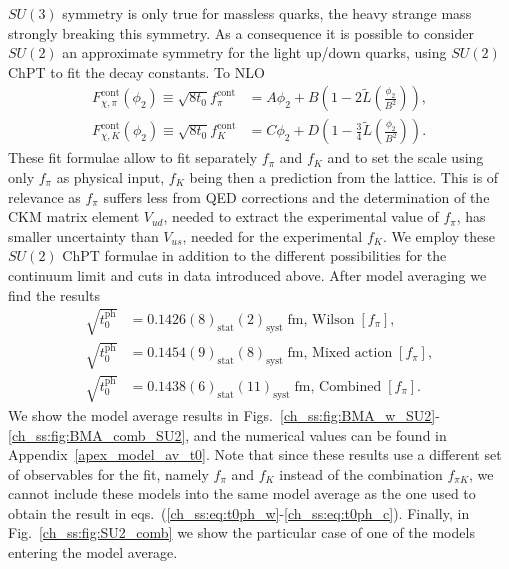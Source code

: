 $SU(3)$ symmetry is only true for massless quarks, the heavy strange mass strongly breaking this symmetry. As a consequence it is possible to consider $SU(2)$ an approximate symmetry for the light up/down quarks, using $SU(2)$ ChPT to fit the decay constants. To NLO~\citep{SU2}
\begin{align}
\label{ch_ss:eq:SU2pi}
F_{\chi,\pi}^{\textrm{cont}}(\phi_2)\equiv\sqrt{8t_0}f_{\pi}^{\textrm{cont}}&=A\phi_2+B\left(1-2\tilde{L}\left(\frac{\phi_2}{B^2}\right)\right),\\
\label{ch_ss:eq:SU2k}
F_{\chi,K}^{\textrm{cont}}(\phi_2)\equiv\sqrt{8t_0}f_K^{\textrm{cont}}&=C\phi_2+D\left(1-\frac{3}{4}\tilde{L}\left(\frac{\phi_2}{B^2}\right)\right).
\end{align}
These fit formulae allow to fit separately $f_{\pi}$ and $f_K$ and to set the scale using only $f_{\pi}$ as physical input, $f_K$ being then a prediction from the lattice. This is of relevance as $f_{\pi}$ suffers less from QED corrections and the determination of the CKM matrix element $V_{ud}$, needed to extract the experimental value of $f_{\pi}$, has smaller uncertainty than $V_{us}$, needed for the experimental $f_K$. We employ these $SU(2)$ ChPT formulae in addition to the different possibilities for the continuum limit and cuts in data introduced above. After model averaging we find the results
\begin{align}
\label{ch_ss:eq:t0ph_fpi}
\sqrt{t_0^{\textrm{ph}}}&=0.1426(8)_{\textrm{stat}}(2)_{\textrm{syst}}\;\textrm{fm, Wilson}\;[f_{\pi}], \\
\sqrt{t_0^{\textrm{ph}}}&=0.1454(9)_{\textrm{stat}}(8)_{\textrm{syst}}\;\textrm{fm, Mixed action}\;[f_{\pi}], \\
\sqrt{t_0^{\textrm{ph}}}&=0.1438(6)_{\textrm{stat}}(11)_{\textrm{syst}}\;\textrm{fm, Combined}\;[f_{\pi}].
\end{align}
We show the model average results in Figs.~\ref{ch_ss:fig:BMA_w_SU2}-\ref{ch_ss:fig:BMA_comb_SU2}, and the numerical values can be found in Appendix~\ref{apex_model_av_t0}. Note that since these results use a different set of observables for the fit, namely $f_{\pi}$ and $f_K$ instead of the combination $f_{\pi K}$, we cannot include these models into the same model average as the one used to obtain the result in eqs.~(\ref{ch_ss:eq:t0ph_w}-\ref{ch_ss:eq:t0ph_c}). Finally, in Fig.~\ref{ch_ss:fig:SU2_comb} we show the particular case of one of the models entering the model average.

